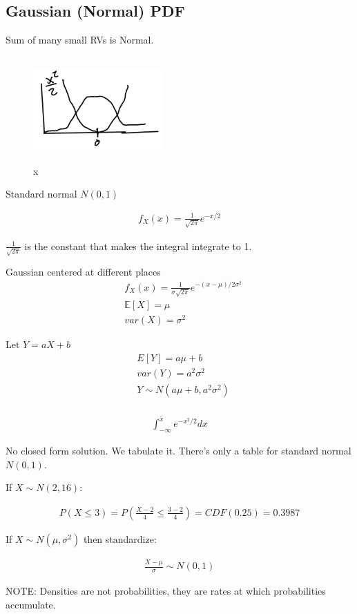\subsection{Gaussian (Normal) PDF}


Sum of many small RVs is Normal.

\begin{figure}[ht]
\centering
\includegraphics[width=5cm, height=4cm]{images/L08/gaussian_pdf.jpeg}
\caption{x}
\end{figure}

Standard normal $N(0,1)$

\begin{align}
f_X(x) = \frac{1}{\sqrt{2\pi}} e^{-x/2}
\end{align}

$\frac{1}{\sqrt{2\pi}}$ is the constant that makes the integral integrate to 1.

Gaussian centered at different places
\begin{align}
&f_X(x) = \frac{1}{\sigma\sqrt{2\pi}} e^{-(x-\mu)/2\sigma^2}\\
&\mathbb{E}[X]=\mu \\
&var(X)= \sigma^2
\end{align}

Let $Y=aX+b$
\begin{align*}
&E[Y]=a\mu+b\\
&var(Y)= a^2 \sigma^2\\
&Y \sim N(a\mu+b, a^2 \sigma^2)\\
\end{align*}


\begin{align*}
\int_{-\infty}^{\bar{x}} e^{-x^2/2}dx
\end{align*}

No closed form solution.  We tabulate it.  There's only a table for standard normal $N(0,1)$.

If $X \sim N(2,16)$:

\begin{align*}
P(X \le 3) = P\left( \frac{X-2}{4} \le \frac{3-2}{4} \right) = CDF(0.25)=0.3987
\end{align*}

If $X \sim N(\mu,\sigma^2)$ then standardize:

\begin{align*}
\frac{X- \mu}{\sigma} \sim N(0,1)
\end{align*}

NOTE: Densities are not probabilities, they are rates at which probabilities accumulate.
